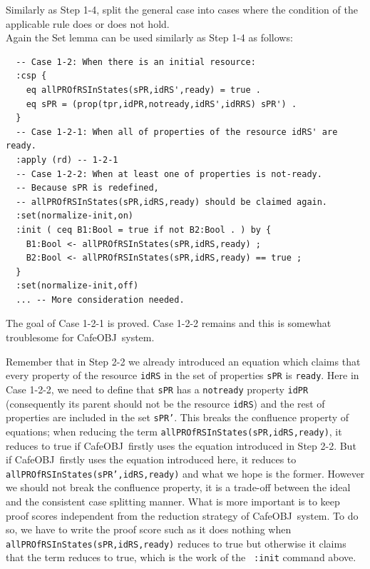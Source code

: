 \documentclass[12pt]{report}
\newcommand{\stt}[1]{{\small{\tt {#1}}}}
\newcommand{\cafeobj}{{\sf CafeOBJ}~}
\begin{document}
 Similarly as Step 1-4, split the general case
into cases where the condition of the applicable rule does or does not
hold. \\ Again the Set lemma can be used similarly as Step 1-4 as
follows:
\small
\begin{verbatim}
  -- Case 1-2: When there is an initial resource:
  :csp {
    eq allPROfRSInStates(sPR,idRS',ready) = true .
    eq sPR = (prop(tpr,idPR,notready,idRS',idRRS) sPR') .
  }
  -- Case 1-2-1: When all of properties of the resource idRS' are ready.
  :apply (rd) -- 1-2-1
  -- Case 1-2-2: When at least one of properties is not-ready.
  -- Because sPR is redefined, 
  -- allPROfRSInStates(sPR,idRS,ready) should be claimed again.
  :set(normalize-init,on)
  :init ( ceq B1:Bool = true if not B2:Bool . ) by {
    B1:Bool <- allPROfRSInStates(sPR,idRS,ready) ;
    B2:Bool <- allPROfRSInStates(sPR,idRS,ready) == true ;
  }
  :set(normalize-init,off)
  ... -- More consideration needed.
\end{verbatim}
\normalsize
The goal of Case 1-2-1 is proved. Case 1-2-2 remains and this is somewhat
troublesome for \cafeobj system.

Remember that in Step 2-2 we already introduced an equation which
claims that every property of the resource {\tt idRS} in the set of
properties {\tt sPR} is {\tt ready}. Here in Case 1-2-2, we need to
define that {\tt sPR} has a {\tt notready} property {\tt idPR}
(consequently its parent should not be the resource {\tt idRS}) and
the rest of properties are included in the set {\tt sPR'}. This breaks
the confluence property of equations; when reducing the term
\stt{allPROfRSInStates(sPR,idRS,ready)}, it reduces to true if
\cafeobj firstly uses the equation introduced in Step 2-2. But if
\cafeobj firstly uses the equation introduced here, it reduces to
\stt{allPROfRSInStates(sPR',idRS,ready)} and what we hope is the
former. However we should not break the confluence property, it is a
trade-off between the ideal and the consistent case splitting manner.
What is more important is to keep proof scores independent from the
reduction strategy of \cafeobj system. To do so, we have to write the
proof score such as it does nothing when
\stt{allPROfRSInStates(sPR,idRS,ready)} reduces to true but otherwise
it claims that the term reduces to true, which is the work of the {\tt
  :init} command above.
\end{document}
